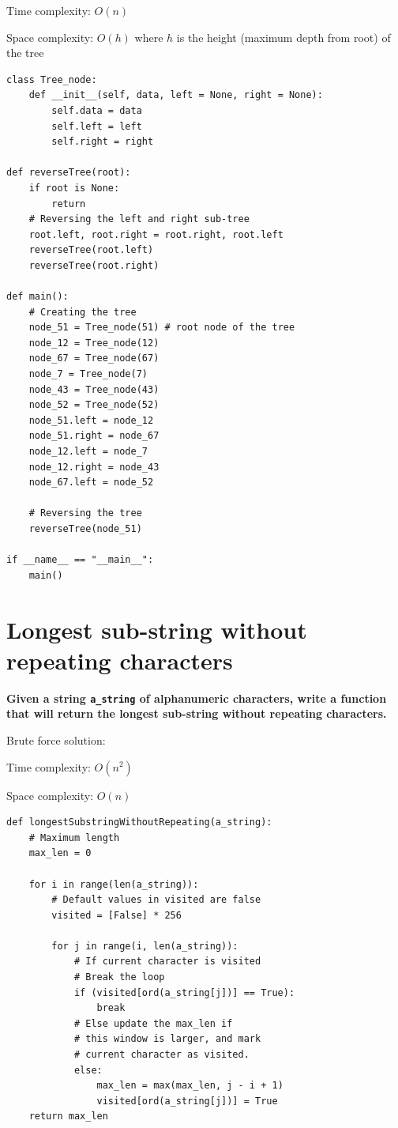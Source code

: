 \documentclass[a4paper,11pt]{book}
\begin{document}
\noindent Time complexity: $O(n)$

\noindent Space complexity: $O(h)$ where $h$ is the height (maximum depth from root) of the tree

\begin{lstlisting}
class Tree_node:
    def __init__(self, data, left = None, right = None):
        self.data = data
        self.left = left
        self.right = right
    
def reverseTree(root):
	if root is None:
		return
	# Reversing the left and right sub-tree
	root.left, root.right = root.right, root.left
	reverseTree(root.left)
	reverseTree(root.right)
    
def main():
	# Creating the tree
	node_51 = Tree_node(51) # root node of the tree
	node_12 = Tree_node(12)
	node_67 = Tree_node(67)
	node_7 = Tree_node(7)
	node_43 = Tree_node(43)
	node_52 = Tree_node(52)
	node_51.left = node_12
	node_51.right = node_67
	node_12.left = node_7
	node_12.right = node_43
	node_67.left = node_52

	# Reversing the tree
	reverseTree(node_51)

if __name__ == "__main__":
	main()
\end{lstlisting}

\newpage
\section{Longest sub-string without repeating characters}

\noindent \textbf{Given a string \lstinline{a_string} of alphanumeric characters, write a function that will return the longest sub-string without repeating characters.}
\vspace{5mm}

\noindent Brute force solution:

\noindent Time complexity: $O(n^2)$

\noindent Space complexity: $O(n)$

\begin{lstlisting}
def longestSubstringWithoutRepeating(a_string):    
    # Maximum length
    max_len = 0
  
    for i in range(len(a_string)):
        # Default values in visited are false
        visited = [False] * 256  
  
        for j in range(i, len(a_string)):
            # If current character is visited
            # Break the loop
            if (visited[ord(a_string[j])] == True):
                break
            # Else update the max_len if
            # this window is larger, and mark
            # current character as visited.
            else:
                max_len = max(max_len, j - i + 1)
                visited[ord(a_string[j])] = True
    return max_len
\end{lstlisting}
\end{document}
